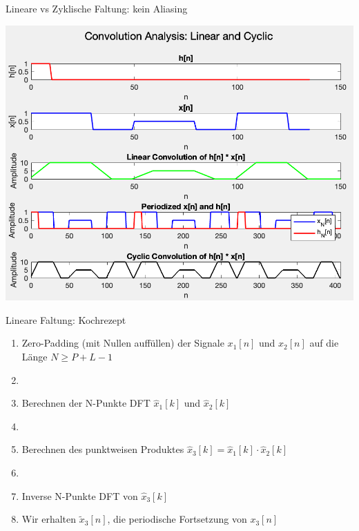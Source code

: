 \documentclass[14pt, aspectratio=169, handout]{beamer}
\begin{document}
\begin{frame}{Lineare vs Zyklische Faltung: kein Aliasing}
    \noindent
    \begin{minipage}{0.6\textwidth}
        \includegraphics[width=\linewidth]{figures/conv_no_alias.png}
    \end{minipage}
    \hfill
    \begin{minipage}{0.35\textwidth}
        
    \end{minipage}
\end{frame}

\begin{frame}{Lineare Faltung: Kochrezept}
    \begin{enumerate}
    \item Zero-Padding (mit Nullen auffüllen) der Signale $x_1[n]$ und $x_2[n]$ auf die Länge $N \geq P + L - 1$
    \item[] 
    \item Berechnen der \textcolor{myred}{N-Punkte} DFT $\hat{x}_1[k]$ und $\hat{x}_2[k]$
    \item[] 
    \item Berechnen des punktweisen Produktes $\hat{x}_3[k] = \hat{x}_1[k] \cdot  \hat{x}_2[k]$
    \item[] 
    \item Inverse N-Punkte DFT von $\hat{x}_3[k]$
    \item[] Wir erhalten $\tilde{x}_3[n]$, die periodische Fortsetzung von $x_3[n]$
\end{enumerate}
\end{frame}
\end{document}
